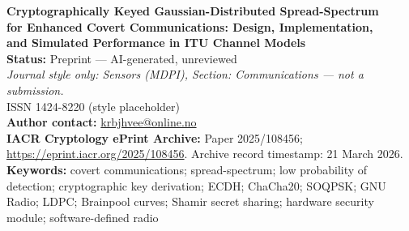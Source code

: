 \documentclass[10pt,a4paper,twocolumn]{article}
\begin{document}
\onecolumn
\noindent\setlength{\fboxrule}{1.5pt}\setlength{\fboxsep}{8pt}%
\vspace{14pt}
\begin{center}
{\Large\bfseries Cryptographically Keyed Gaussian-Distributed Spread-Spectrum\\
for Enhanced Covert Communications: Design, Implementation,\\
and Simulated Performance in ITU Channel Models}\\[10pt]
{\normalsize\textbf{Status:} Preprint --- AI-generated, unreviewed}\\[6pt]
{\small\textit{Journal style only: Sensors (MDPI), Section: Communications --- not a submission.}}\\[4pt]
{\small ISSN 1424-8220 (style placeholder)}\\[6pt]
{\small\textbf{Author contact:} \href{mailto:krbjhvee@online.no}{krbjhvee@online.no}}\\[6pt]
{\small\textbf{IACR Cryptology ePrint Archive:} Paper 2025/108456; \url{https://eprint.iacr.org/2025/108456}. Archive record timestamp: 21 March 2026.}\\[8pt]
{\small\textbf{Keywords:} covert communications; spread-spectrum; low probability of detection;
cryptographic key derivation; ECDH; ChaCha20; SOQPSK; GNU Radio; LDPC;
Brainpool curves; Shamir secret sharing; hardware security module;
software-defined radio}
\end{center}
\vspace{10pt}
\end{document}

